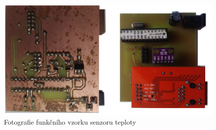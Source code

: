 \documentclass[12pt,a4paper]{article}
\begin{document}
\begin{figure}[H]
\centering
\label{fig:foto/arduino-ethernet-sensor}
\includegraphics[width = 150mm]{../img/foto/arduino-ethernet-sensor.jpg}
\caption{Fotografie funkčního vzorku senzoru teploty}
\end{figure}

\newpage

\printindex[zkr]


\newpage
\end{document}
